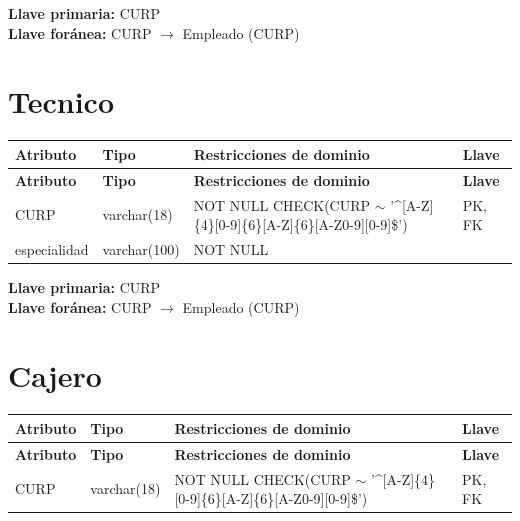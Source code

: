 \documentclass[12pt]{article}
\begin{document}
\vspace{2pt}
\textbf{Llave primaria:} CURP\\
\textbf{Llave foránea:} CURP $\rightarrow$ Empleado (CURP)\\


\section*{Tecnico}

\begin{longtable}{p{3.5cm} p{2.5cm} p{7.5cm} p{1.5cm}}
\label{tab:tecnico}\\
\toprule
\textbf{Atributo} & \textbf{Tipo} & \textbf{Restricciones de dominio} & \textbf{Llave} \\
\midrule
\endfirsthead

\toprule
\textbf{Atributo} & \textbf{Tipo} & \textbf{Restricciones de dominio} & \textbf{Llave} \\
\midrule
\endhead

\bottomrule
\endfoot

CURP 
& varchar(18) 
& NOT NULL \newline CHECK(CURP $\sim$ '\^{}[A-Z]\{4\}[0-9]\{6\}[A-Z]\{6\}[A-Z0-9][0-9]\$')
& PK, FK \\

especialidad 
& varchar(100)
& NOT NULL
& \\

\end{longtable}

\vspace{2pt}
\textbf{Llave primaria:} CURP\\
\textbf{Llave foránea:} CURP $\rightarrow$ Empleado (CURP)\\

\section*{Cajero}

\begin{longtable}{p{3.5cm} p{2.5cm} p{7.5cm} p{1.5cm}}
\label{tab:cajero}\\
\toprule
\textbf{Atributo} & \textbf{Tipo} & \textbf{Restricciones de dominio} & \textbf{Llave} \\
\midrule
\endfirsthead

\toprule
\textbf{Atributo} & \textbf{Tipo} & \textbf{Restricciones de dominio} & \textbf{Llave} \\
\midrule
\endhead

\bottomrule
\endfoot

CURP 
& varchar(18) 
& NOT NULL \newline CHECK(CURP $\sim$ '\^{}[A-Z]\{4\}[0-9]\{6\}[A-Z]\{6\}[A-Z0-9][0-9]\$')
& PK, FK \\

\end{longtable}
\end{document}
